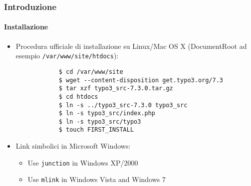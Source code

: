 \begin{frame}[fragile]
	\frametitle{Introduzione}
	\framesubtitle{Installazione}

	\begin{itemize}
		\item Procedura ufficiale di installazione su Linux/Mac OS X\newline
			(DocumentRoot ad esempio \texttt{/var/www/site/htdocs}):
		\begin{lstlisting}
			$ cd /var/www/site
			$ wget --content-disposition get.typo3.org/7.3
			$ tar xzf typo3_src-7.3.0.tar.gz
			$ cd htdocs
			$ ln -s ../typo3_src-7.3.0 typo3_src
			$ ln -s typo3_src/index.php
			$ ln -s typo3_src/typo3
			$ touch FIRST_INSTALL
		\end{lstlisting}

		\item Link simbolici in Microsoft Windows:

			\begin{itemize}
				\item Use \texttt{junction} in Windows XP/2000
				\item Use \texttt{mlink} in Windows Vista and Windows 7
			\end{itemize}

	\end{itemize}
\end{frame}

